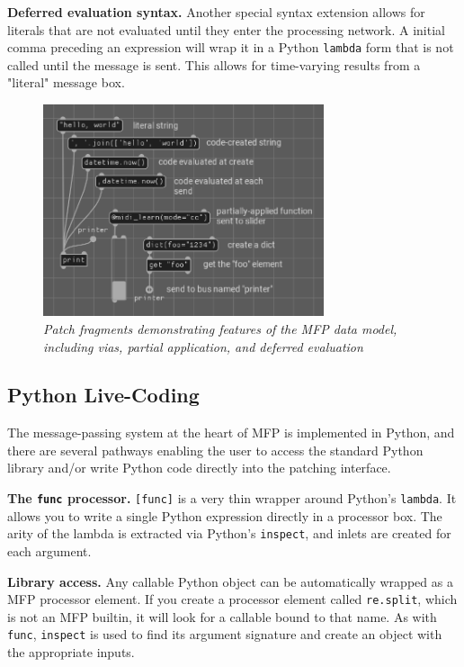 \documentclass[a4paper]{article}
\def\:{\hskip0pt}
\begin{document}
{\bf Deferred evaluation syntax.} Another special syntax
extension allows for literals that are not evaluated until they
enter the processing network. A initial comma preceding an
expression will wrap it in a Python {\tt lambda} form that is not
called until the message is sent. This allows for time-varying
results from a "literal" message box.

\begin{figure}[ht]
\centerline{\includegraphics[width=3.25in]{datamodel.png}}
\caption{\label{fig:datamodel}{
    \it Patch fragments demonstrating features of the MFP data model,
    including vias, partial application, and deferred evaluation
}}
\end{figure}


\subsection{Python Live-Coding }

The message\:-\:passing system at the heart of MFP is implemented in
Python, and there are several pathways enabling the user to
access the standard Python library and/or write Python code
directly into the patching interface.

{\bf The {\tt func} processor.} {\tt [func]} is a very thin wrapper
around Python's {\tt lambda}. It allows you to write a single
Python expression directly in a processor box. The arity of the lambda
is extracted via Python's {\tt inspect}, and inlets are created for
each argument.

{\bf Library access.} Any callable Python object can be
automatically wrapped as a MFP processor element. If you create a
processor element called {\tt re.split}, which is not an MFP
builtin, it will look for a callable bound to that name. As with
{\tt func}, {\tt inspect} is used to find its argument signature
and create an object with the appropriate inputs.
\end{document}

